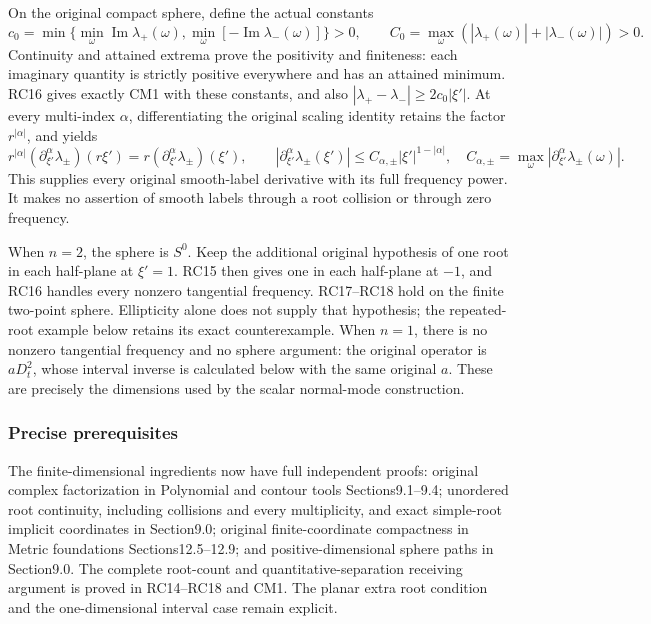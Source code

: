 \documentclass[
  11pt,
]{article}
\makeatletter
\let\ReaderOriginalAnchorStart\hyper@anchorstart
\let\ReaderOriginalAnchorEnd\hyper@anchorend
\let\ReaderPendingAliases\@empty
\def\ReaderArmAliases#1{\gdef\ReaderPendingAliases{#1}}
\def\hyper@anchorstart#1{\ReaderIfNativeAnchorTF{#1}{\ReaderPendingAliases\global\let\ReaderPendingAliases\@empty}{}\ReaderOriginalAnchorStart{#1}}
\makeatother
\begin{document}
On the original compact sphere, define the actual constants \[
 c_0=\min\{\min_\omega\operatorname{Im}\lambda_+(\omega),
            \min_\omega[-\operatorname{Im}\lambda_-(\omega)]\}>0,
 \qquad
 C_0=\max_\omega(|\lambda_+(\omega)|+|\lambda_-(\omega)|)>0.
 \tag{RC17}
\] Continuity and attained extrema prove the positivity and finiteness:
each imaginary quantity is strictly positive everywhere and has an
attained minimum. RC16 gives exactly CM1 with these constants, and also
\(|\lambda_+-\lambda_-|\geq2c_0|\xi'|\). At every multi-index
\(\alpha\), differentiating the original scaling identity retains the
factor \(r^{|\alpha|}\), and yields \[
 r^{|\alpha|}(\partial_{\xi'}^\alpha\lambda_\pm)(r\xi')
     =r(\partial_{\xi'}^\alpha\lambda_\pm)(\xi'),\qquad
 |\partial_{\xi'}^\alpha\lambda_\pm(\xi')|
 \leq C_{\alpha,\pm}|\xi'|^{1-|\alpha|},
 \quad
 C_{\alpha,\pm}=\max_\omega
       |\partial_{\xi'}^\alpha\lambda_\pm(\omega)|.
 \tag{RC18}
\] This supplies every original smooth-label derivative with its full
frequency power. It makes no assertion of smooth labels through a root
collision or through zero frequency.

When \(n=2\), the sphere is \(S^0\). Keep the additional original
hypothesis of one root in each half-plane at \(\xi'=1\). RC15 then gives
one in each half-plane at \(-1\), and RC16 handles every nonzero
tangential frequency. RC17--RC18 hold on the finite two-point sphere.
Ellipticity alone does not supply that hypothesis; the repeated-root
example below retains its exact counterexample. When \(n=1\), there is
no nonzero tangential frequency and no sphere argument: the original
operator is \(aD_t^2\), whose interval inverse is calculated below with
the same original \(a\). These are precisely the dimensions used by the
scalar normal-mode construction.

\ReaderArmAliases{\ReaderOriginalAnchorStart{precise-prerequisites}\ReaderOriginalAnchorEnd}
\subsubsection{Precise prerequisites}\label{precise-prerequisites}

The finite-dimensional ingredients now have full independent proofs:
original complex factorization in Polynomial and contour tools
Sections9.1--9.4; unordered root continuity, including collisions and
every multiplicity, and exact simple-root implicit coordinates in
Section9.0; original finite-coordinate compactness in Metric foundations
Sections12.5--12.9; and positive-dimensional sphere paths in Section9.0.
The complete root-count and quantitative-separation receiving argument
is proved in RC14--RC18 and CM1. The planar extra root condition and the
one-dimensional interval case remain explicit.
\end{document}
